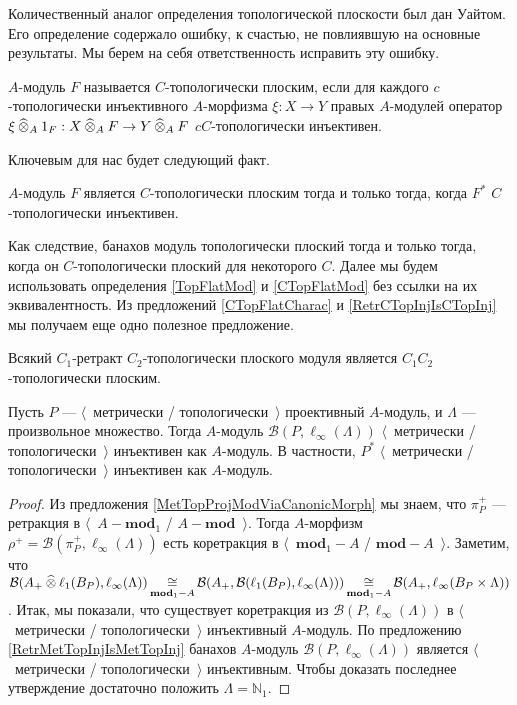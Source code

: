 Количественный аналог определения топологической плоскости был дан Уайтом. Его определение содержало ошибку, к счастью, не повлиявшую на основные результаты. Мы берем на себя ответственность исправить эту ошибку.

\begin{definition}\label{CTopFlatMod} $A$-модуль $F$ называется $C$-топологически плоским, если для каждого $c$-топологически инъективного $A$-морфизма $\xi:X\to Y$ правых $A$-модулей оператор $\xi\mathbin{\widehat{\otimes}}_{A} 1_F:X\mathbin{\widehat{\otimes}}_{A} F\to Y\mathbin{\widehat{\otimes}}_{A} F$ $cC$-топологически инъективен.
\end{definition}

Ключевым для нас будет следующий факт.

\begin{proposition}\label{CTopFlatCharac} $A$-модуль $F$ является $C$-топологически плоским тогда и только тогда, когда $F^*$ $C$-топологически инъективен.
\end{proposition}

Как следствие, банахов модуль топологически плоский тогда и только тогда, когда он $C$-топологически плоский для некоторого $C$. Далее мы будем использовать определения \ref{TopFlatMod} и \ref{CTopFlatMod} без ссылки на их эквивалентность. Из предложений \ref{CTopFlatCharac} и \ref{RetrCTopInjIsCTopInj} мы получаем еще одно полезное предложение.

\begin{proposition}\label{RetrCTopFlatIsCTopFlat} Всякий $C_1$-ретракт $C_2$-топологически плоского модуля является $C_1C_2$-топологически плоским.
\end{proposition}

\begin{proposition}\label{DualMetTopProjIsMetrInj} Пусть $P$ --- $\langle$~метрически / топологически~$\rangle$ проективный $A$-модуль, и $\Lambda$ --- произвольное множество. Тогда $A$-модуль $\mathcal{B}(P,\ell_\infty(\Lambda))$ $\langle$~метрически / топологически~$\rangle$ инъективен как $A$-модуль. В частности, $P^*$ $\langle$~метрически / топологически~$\rangle$ инъективен как $A$-модуль.
\end{proposition}
\begin{proof} Из предложения \ref{MetTopProjModViaCanonicMorph} мы знаем, что $\pi_P^+$ --- ретракция в $\langle$~$A-\mathbf{mod}_1$ / $A-\mathbf{mod}$~$\rangle$. Тогда $A$-морфизм $\rho^+=\mathcal{B}(\pi_P^+,\ell_\infty(\Lambda))$ есть коретракция в $\langle$~$\mathbf{mod}_1-A$ / $\mathbf{mod}-A$~$\rangle$. Заметим, что $\mathcal{B}(A_+\mathbin{\widehat{\otimes}}\ell_1(B_P),\ell_\infty(\Lambda))\mathop{\mathbin{\cong}}\limits_{\mathbf{mod}_1-A}\mathcal{B}(A_+,\mathcal{B}(\ell_1(B_P),\ell_\infty(\Lambda)))\mathop{\mathbin{\cong}}\limits_{\mathbf{mod}_1-A}\mathcal{B}(A_+,\ell_\infty(B_P\times\Lambda))$. Итак, мы показали, что существует коретракция из $\mathcal{B}(P,\ell_\infty(\Lambda))$ в $\langle$~метрически / топологически~$\rangle$ инъективный $A$-модуль. По предложению \ref{RetrMetTopInjIsMetTopInj} банахов $A$-модуль $\mathcal{B}(P,\ell_\infty(\Lambda))$ является $\langle$~метрически / топологически~$\rangle$ инъективным. Чтобы доказать последнее утверждение достаточно положить $\Lambda=\mathbb{N}_1$.
\end{proof}

